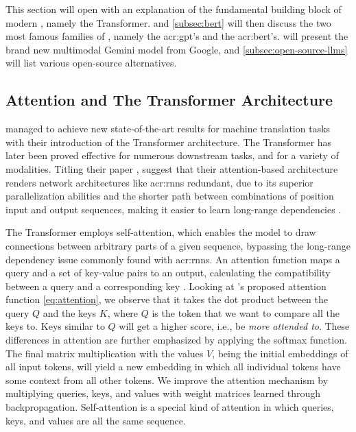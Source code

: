This section will open with an explanation of the fundamental building block of modern , namely the Transformer.  and \autoref{subsec:bert} will then discuss the two most famous families of , namely the \acrshort{acr:gpt}'s and the \acrshort{acr:bert}'s.  will present the brand new multimodal Gemini model from Google, and \autoref{subsec:open-source-llms} will list various open-source alternatives.

\subsection{Attention and The Transformer Architecture}\label{subsec:attention-and-transformers}

\cite{vaswaniAttentionAllYou2017} managed to achieve new state-of-the-art results for machine translation tasks with their introduction of the Transformer architecture. The Transformer has later been proved effective for numerous downstream tasks, and for a variety of modalities. Titling their paper , \citeauthor{vaswaniAttentionAllYou2017} suggest that their attention-based architecture renders network architectures like \glspl{acr:rnn} redundant, due to its superior parallelization abilities and the shorter path between combinations of position input and output sequences, making it easier to learn long-range dependencies \citep[6]{vaswaniAttentionAllYou2017}.

The Transformer employs self-attention, which enables the model to draw connections between arbitrary parts of a given sequence, bypassing the long-range dependency issue commonly found with \glspl{acr:rnn}. An attention function maps a query and a set of key-value pairs to an output, calculating the compatibility between a query and a corresponding key \citep[3]{vaswaniAttentionAllYou2017}. Looking at \citeauthor{vaswaniAttentionAllYou2017}'s proposed attention function \eqref{eq:attention}, we observe that it takes the dot product between the query $Q$ and the keys $K$, where $Q$ is the token that we want to compare all the keys to. Keys similar to $Q$ will get a higher score, i.e., be \textit{more attended to}. These differences in attention are further emphasized by applying the softmax function. The final matrix multiplication with the values $V$, being the initial embeddings of all input tokens, will yield a new embedding in which all individual tokens have some context from all other tokens. We improve the attention mechanism by multiplying queries, keys, and values with weight matrices learned through backpropagation. Self-attention is a special kind of attention in which queries, keys, and values are all the same sequence.


